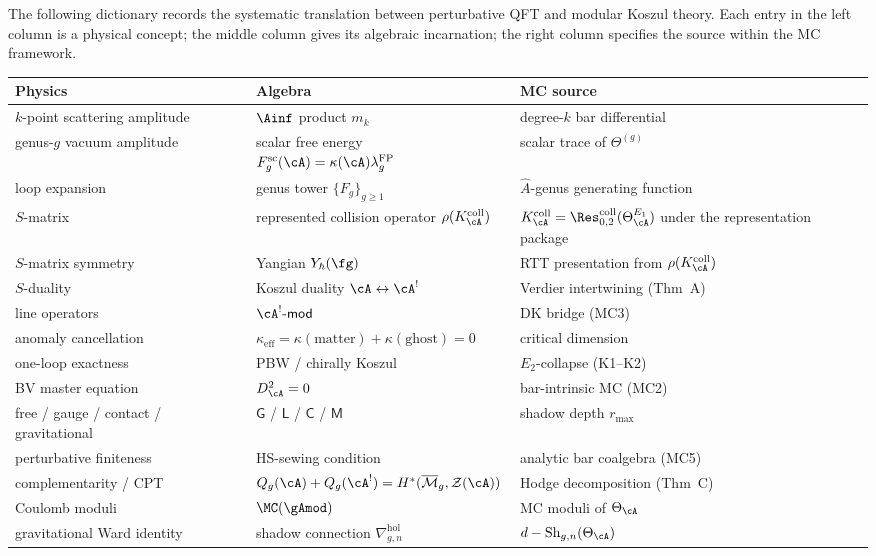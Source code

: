 \noindent
The following dictionary records the systematic translation
between perturbative QFT and modular Koszul theory.
Each entry in the left column is a physical concept;
the middle column gives its algebraic incarnation;
the right column specifies the source within the
MC framework.

\begin{center}
\small
\renewcommand{\arraystretch}{1.15}
\begin{tabular}{@{}lll@{}}
\toprule
\textbf{Physics} & \textbf{Algebra}
 & \textbf{MC source} \\
\midrule
$k$-point scattering amplitude
 & $\Ainf$ product $m_k$
 & degree-$k$ bar differential \\[2pt]
genus-$g$ vacuum amplitude
 & scalar free energy
 $F_g^{\mathrm{sc}}(\cA)=\kappa(\cA)\lambda_g^{\mathrm{FP}}$
 & scalar trace of $\Theta^{(g)}$ \\[2pt]
loop expansion
 & genus tower $\{F_g\}_{g \geq 1}$
 & $\hat{A}$-genus generating function \\[2pt]
$S$-matrix
 & represented collision operator $\rho(K_\cA^{\mathrm{coll}})$
 & $K_\cA^{\mathrm{coll}}=
 \Res^{\mathrm{coll}}_{0,2}(\Theta_\cA^{E_1})$ under the
 representation package \\[2pt]
$S$-matrix symmetry
 & Yangian $Y_{\hbar}(\fg)$
 & RTT presentation from $\rho(K_\cA^{\mathrm{coll}})$ \\[2pt]
$S$-duality
 & Koszul duality $\cA \leftrightarrow \cA^!$
 & Verdier intertwining (Thm~A) \\[2pt]
line operators
 & $\cA^!\text{-}\mathsf{mod}$
 & DK bridge (MC3) \\[2pt]
anomaly cancellation
 & $\kappa_{\mathrm{eff}} = \kappa(\mathrm{matter}) + \kappa(\mathrm{ghost}) = 0$
 & critical dimension \\[2pt]
one-loop exactness
 & PBW / chirally Koszul
 & $E_2$-collapse (K1--K2) \\[2pt]
BV master equation
 & $D_\cA^2 = 0$
 & bar-intrinsic MC (MC2) \\[2pt]
free / gauge / contact / gravitational
 & $\mathsf{G}$ / $\mathsf{L}$ / $\mathsf{C}$ / $\mathsf{M}$
 & shadow depth $r_{\max}$ \\[2pt]
perturbative finiteness
 & HS-sewing condition
 & analytic bar coalgebra (MC5) \\[2pt]
complementarity / CPT
 & $Q_g(\cA) + Q_g(\cA^!) = H^*(\overline{\mathcal{M}}_g, \mathcal{Z}(\cA))$
 & Hodge decomposition (Thm~C) \\[2pt]
Coulomb moduli
 & $\MC(\gAmod)$
 & MC moduli of $\Theta_\cA$ \\[2pt]
gravitational Ward identity
 & shadow connection $\nabla^{\mathrm{hol}}_{g,n}$
 & $d - \mathrm{Sh}_{g,n}(\Theta_\cA)$ \\
\bottomrule
\end{tabular}
\end{center}

